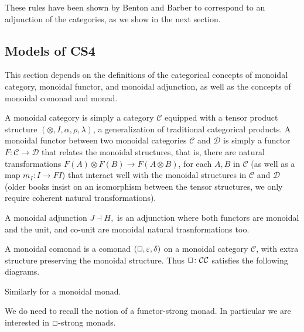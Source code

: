 \documentclass{article}
\let\mto\to
\let\to\relax
\newcommand{\to}{\rightarrow}
\renewcommand{\Box}{\oblong}
\newcommand{\cat}[1]{\mathcal{#1}}
\begin{document}
These rules have been shown by Benton \cite{benton1995} and Barber to correspond to an adjunction of the categories, as we show in the next section.  

\subsection{Models of CS4}
\label{subsec:single_adjoint_model_of_cs4}

This section depends on the definitions of the
categorical concepts of monoidal category, monoidal functor, and
monoidal adjunction, as well as the concepts of monoidal comonad and monad. 

A monoidal category is simply a category $\cat{C}$  equipped with a tensor product structure $(\otimes, I, \alpha, \rho, \lambda)$, a generalization of traditional categorical products. A monoidal functor between two monoidal categories $\cat{C}$ and $\cat{D}$ is simply a functor $F\colon \cat{C} \mto \cat{D}$ that relates the monoidal structures, that is, there are natural transformations  $F(A)\otimes F(B)\mto F(A \otimes B)$, for each $A,B$ in $\cat{C}$ (as well as a map $m_{I}\colon I \mto FI$) that interact well with the monoidal structures  in $\cat{C}$ and  $\cat{D}$ (older books insist on an isomorphism between the tensor structures, we only require coherent natural transformations). 

A monoidal adjunction $J \dashv H, $ is an adjunction  where both functors are monoidal and the unit, and co-unit are monoidal natural trasnformations too. 

A monoidal comonad is a comonad $(\Box,\varepsilon, \delta)$ on a monoidal category $\cat{C}$, with extra structure preserving the monoidal structure. Thus $\Box\colon \cat{C}\to \cat{C}$ satisfies the following diagrams.


Similarly for a monoidal monad.

We do need to recall the notion of a functor-strong monad. In particular we are interested in $\Box$-strong monads.
\end{document}
